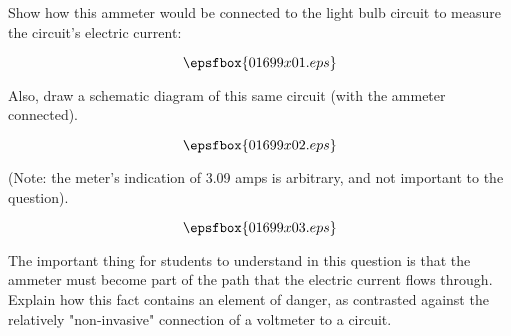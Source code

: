 

Show how this ammeter would be connected to the light bulb circuit to measure the circuit's electric current:

$$\epsfbox{01699x01.eps}$$

Also, draw a schematic diagram of this same circuit (with the ammeter connected).







$$\epsfbox{01699x02.eps}$$

(Note: the meter's indication of 3.09 amps is arbitrary, and not important to the question).

$$\epsfbox{01699x03.eps}$$







The important thing for students to understand in this question is that the ammeter must become part of the path that the electric current flows through.  Explain how this fact contains an element of danger, as contrasted against the relatively "non-invasive" connection of a voltmeter to a circuit.




